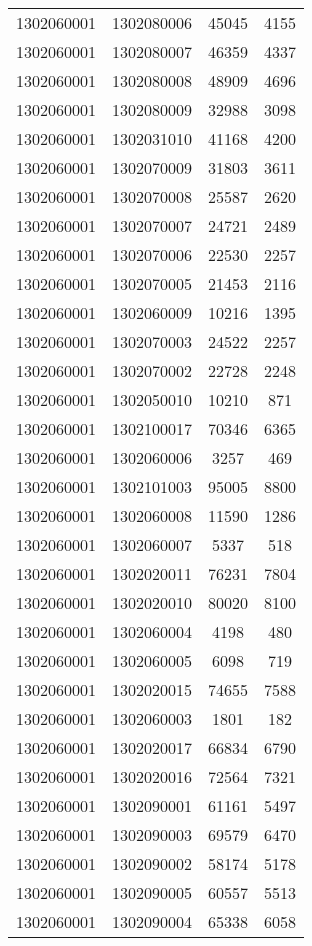 \begin{longtable}[h]{llcc}
		1302060001 & 1302080006 & 45045 & 4155\\
		1302060001 & 1302080007 & 46359 & 4337\\
		1302060001 & 1302080008 & 48909 & 4696\\
		1302060001 & 1302080009 & 32988 & 3098\\
		1302060001 & 1302031010 & 41168 & 4200\\
		1302060001 & 1302070009 & 31803 & 3611\\
		1302060001 & 1302070008 & 25587 & 2620\\
		1302060001 & 1302070007 & 24721 & 2489\\
		1302060001 & 1302070006 & 22530 & 2257\\
		1302060001 & 1302070005 & 21453 & 2116\\
		1302060001 & 1302060009 & 10216 & 1395\\
		1302060001 & 1302070003 & 24522 & 2257\\
		1302060001 & 1302070002 & 22728 & 2248\\
		1302060001 & 1302050010 & 10210 & 871\\
		1302060001 & 1302100017 & 70346 & 6365\\
		1302060001 & 1302060006 & 3257 & 469\\
		1302060001 & 1302101003 & 95005 & 8800\\
		1302060001 & 1302060008 & 11590 & 1286\\
		1302060001 & 1302060007 & 5337 & 518\\
		1302060001 & 1302020011 & 76231 & 7804\\
		1302060001 & 1302020010 & 80020 & 8100\\
		1302060001 & 1302060004 & 4198 & 480\\
		1302060001 & 1302060005 & 6098 & 719\\
		1302060001 & 1302020015 & 74655 & 7588\\
		1302060001 & 1302060003 & 1801 & 182\\
		1302060001 & 1302020017 & 66834 & 6790\\
		1302060001 & 1302020016 & 72564 & 7321\\
		1302060001 & 1302090001 & 61161 & 5497\\
		1302060001 & 1302090003 & 69579 & 6470\\
		1302060001 & 1302090002 & 58174 & 5178\\
		1302060001 & 1302090005 & 60557 & 5513\\
		1302060001 & 1302090004 & 65338 & 6058\\

\end{longtable}
